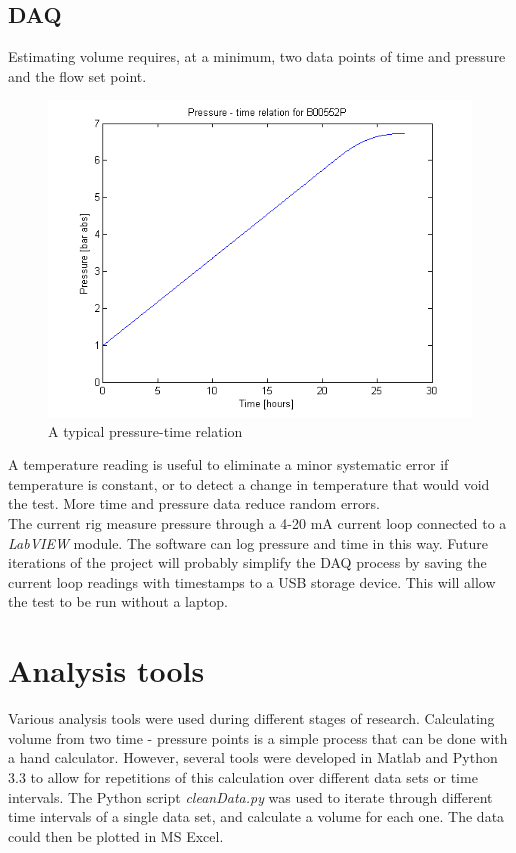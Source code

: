 \documentclass{report}
\begin{document}
\subsection{DAQ}
Estimating volume requires, at a minimum, two data points of time and pressure and the flow set point.
\begin{figure}[h]
\includegraphics[width = \textwidth]{B00552P}
\caption{A typical pressure-time relation}
\label{typical}
\end{figure}
A temperature reading is useful to eliminate a minor systematic error if temperature is constant, or to detect a change in temperature that would void the test. More time and pressure data reduce random errors. \\
The current rig measure pressure through a 4-20 mA current loop connected to a \textit{LabVIEW} module. The software can log pressure and time in this way. Future iterations of the project will probably simplify the DAQ process by saving the current loop readings with timestamps to a USB storage device. This will allow the test to be run without a laptop. 
\section{Analysis tools}
Various analysis tools were used during different stages of research. Calculating volume from two time - pressure points is a simple process that can be done with a hand calculator. However, several tools were developed in Matlab and Python 3.3 to allow for repetitions of this calculation over different data sets or time intervals. The Python script \textit{cleanData.py} was used to iterate through different time intervals of a single data set, and calculate a volume for each one. The data could then be plotted in MS Excel. 
\end{document}
